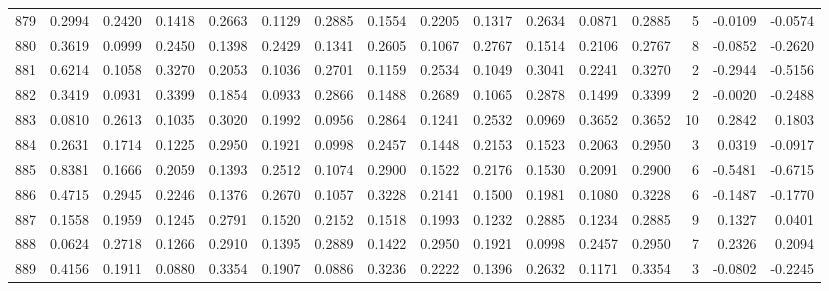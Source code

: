 \begin{tabular}{lrrrrrrrrrrrrrrr}
879 &      0.2994 &  0.2420 &  0.1418 &  0.2663 &  0.1129 &  0.2885 &  0.1554 &  0.2205 &  0.1317 &  0.2634 &   0.0871 &     0.2885 &      5 &                   -0.0109 &                    -0.0574 \\
880 &      0.3619 &  0.0999 &  0.2450 &  0.1398 &  0.2429 &  0.1341 &  0.2605 &  0.1067 &  0.2767 &  0.1514 &   0.2106 &     0.2767 &      8 &                   -0.0852 &                    -0.2620 \\
881 &      0.6214 &  0.1058 &  0.3270 &  0.2053 &  0.1036 &  0.2701 &  0.1159 &  0.2534 &  0.1049 &  0.3041 &   0.2241 &     0.3270 &      2 &                   -0.2944 &                    -0.5156 \\
882 &      0.3419 &  0.0931 &  0.3399 &  0.1854 &  0.0933 &  0.2866 &  0.1488 &  0.2689 &  0.1065 &  0.2878 &   0.1499 &     0.3399 &      2 &                   -0.0020 &                    -0.2488 \\
883 &      0.0810 &  0.2613 &  0.1035 &  0.3020 &  0.1992 &  0.0956 &  0.2864 &  0.1241 &  0.2532 &  0.0969 &   0.3652 &     0.3652 &     10 &                    0.2842 &                     0.1803 \\
884 &      0.2631 &  0.1714 &  0.1225 &  0.2950 &  0.1921 &  0.0998 &  0.2457 &  0.1448 &  0.2153 &  0.1523 &   0.2063 &     0.2950 &      3 &                    0.0319 &                    -0.0917 \\
885 &      0.8381 &  0.1666 &  0.2059 &  0.1393 &  0.2512 &  0.1074 &  0.2900 &  0.1522 &  0.2176 &  0.1530 &   0.2091 &     0.2900 &      6 &                   -0.5481 &                    -0.6715 \\
886 &      0.4715 &  0.2945 &  0.2246 &  0.1376 &  0.2670 &  0.1057 &  0.3228 &  0.2141 &  0.1500 &  0.1981 &   0.1080 &     0.3228 &      6 &                   -0.1487 &                    -0.1770 \\
887 &      0.1558 &  0.1959 &  0.1245 &  0.2791 &  0.1520 &  0.2152 &  0.1518 &  0.1993 &  0.1232 &  0.2885 &   0.1234 &     0.2885 &      9 &                    0.1327 &                     0.0401 \\
888 &      0.0624 &  0.2718 &  0.1266 &  0.2910 &  0.1395 &  0.2889 &  0.1422 &  0.2950 &  0.1921 &  0.0998 &   0.2457 &     0.2950 &      7 &                    0.2326 &                     0.2094 \\
889 &      0.4156 &  0.1911 &  0.0880 &  0.3354 &  0.1907 &  0.0886 &  0.3236 &  0.2222 &  0.1396 &  0.2632 &   0.1171 &     0.3354 &      3 &                   -0.0802 &                    -0.2245 \\

\end{tabular}
